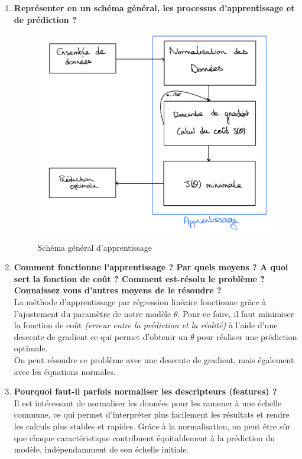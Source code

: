 \begin{enumerate}
\begin{itemize}
    \end{itemize}
    \item \textbf{Représenter en un schéma général, les processus d'apprentissage et de prédiction ?} \\
    \begin{figure}[!h]
        \begin{center}
            \includegraphics[width=.38\textwidth]{./img/schema.jpeg}
            \caption{\label{fig:fig6}Schéma général d'apprentissage}  
        \end{center}
    \end{figure}
    \item \textbf{Comment fonctionne l'apprentissage ? Par quels moyens ? A quoi sert la fonction de coût ? Comment est-résolu le problème ? Connaissez vous d'autres moyens de le résoudre ?} \\
    La méthode d'apprentissage par régression linéaire fonctionne grâce à l'ajustement du paramètre de notre modèle $\theta$. Pour ce faire, il faut minimiser la fonction de coût \textit{(erreur entre la prédiction et la réalité)} à l'aide
    d'une descente de gradient ce qui permet d'obtenir un $\theta$ pour réaliser une prédiction optimale. \\
    On peut résoudre ce problème avec une descente de gradient, mais également avec les équations normales.

    \item \textbf{Pourquoi faut-il parfois normaliser les descripteurs (features) ?} \\
    Il est intéressant de normaliser les données pour les ramener à une échelle commune, 
    ce qui permet d'interpréter plus facilement les résultats et rendre les calculs plus stables et rapides. Grâce à la normalisation, on peut être sûr que chaque caractéristique contribuent équitablement à la prédiction du modèle, indépendamment de son échelle initiale. \\
    
\end{enumerate}
